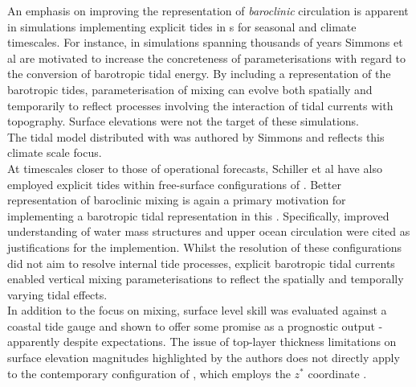 An emphasis on improving the representation of \emph{baroclinic} circulation is apparent in simulations implementing explicit tides in \OGCM{}s for seasonal and climate timescales.  
For instance, in simulations spanning thousands of years Simmons et al \citep{Simmons:2004fi} are motivated to increase the concreteness of parameterisations with regard to the conversion of barotropic tidal energy.  
By including a representation of the barotropic tides, parameterisation of mixing can evolve both spatially and temporarily to reflect processes involving the interaction of tidal currents with topography.   
Surface elevations were not the target of these simulations. \\
The tidal model distributed with \MOM{} was authored by Simmons \cite[pp263] {Griffies:2008vh} and reflects this climate scale focus.\\



At timescales closer to those of operational forecasts, Schiller et al have also employed explicit tides within free-surface configurations of \MOM{}.  
Better representation of baroclinic mixing is again a primary motivation for implementing a barotropic tidal representation in this \OGCM{}. Specifically, improved understanding of water mass structures \cite{Schiller:2004fv} and upper ocean circulation \cite{Schiller:2007gk} were cited as justifications for the implemention.  
Whilst the resolution of these configurations did not aim to resolve internal tide processes, explicit barotropic tidal currents enabled vertical mixing parameterisations to reflect the spatially and temporally varying tidal effects.\\
In addition to the focus on mixing, surface level skill was evaluated against a coastal tide gauge and shown to offer some promise as a prognostic output \citep[Fig 2]{Schiller:2007gk} - apparently despite expectations.   
The issue of top-layer thickness limitations on surface elevation magnitudes highlighted by the authors does not directly apply to the contemporary \BL{} configuration of \MOM{}, which employs the $z^*$ coordinate \citep{Brassington:2012wm}.\\



